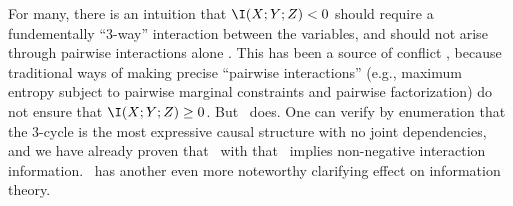 For many, there is an
intuition that
$\I(X;Y;Z) < 0$
should require
a fundementally ``3-way'' interaction between the variables,
and should not arise through pairwise interactions alone \citep{dit-stumble}.
This has been a source of conflict 
\citep{williams2010nonnegative,mackay2003information,1219753,CoverThomas},
%
because traditional ways of making 
precise ``pairwise interactions'' 
(e.g., maximum entropy subject to pairwise marginal constraints 
and pairwise factorization)
 do not ensure that $\I(X;Y;Z) \ge 0$. 
But \scibility\ does. 
One can verify by enumeration that the 3-cycle is the most expressive causal structure with no joint dependencies, 
and we have already proven that \scibility\ with that \hgraph\ 
implies non-negative interaction information.
\Scibility\ has another even more noteworthy clarifying effect on information theory. 

